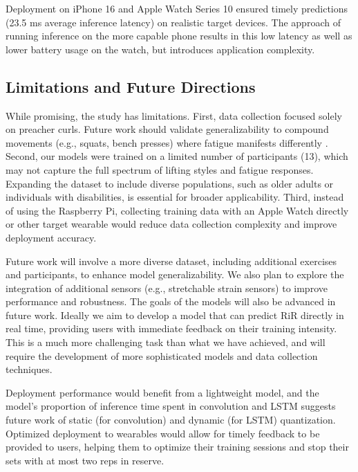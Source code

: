 \documentclass[conference]{IEEEtran}
\begin{document}
Deployment on iPhone 16 and Apple Watch Series 10 ensured timely predictions (23.5 ms average inference latency) on realistic target devices. The approach of running inference on the more capable phone results in this low latency as well as lower battery usage on the watch, but introduces application complexity.

\subsection{Limitations and Future Directions}
While promising, the study has limitations. First, data collection focused solely on preacher curls. Future work should validate generalizability to compound movements (e.g., squats, bench presses) where fatigue manifests differently \cite{velloso2013qualitative}. Second, our models were trained on a limited number of participants (13), which may not capture the full spectrum of lifting styles and fatigue responses. Expanding the dataset to include diverse populations, such as older adults or individuals with disabilities, is essential for broader applicability. Third, instead of using the Raspberry Pi, collecting training data with an Apple Watch directly or other target wearable would reduce data collection complexity and improve deployment accuracy.

Future work will involve a more diverse dataset, including additional exercises and participants, to enhance model generalizability. We also plan to explore the integration of additional sensors (e.g., stretchable strain sensors) to improve performance and robustness. The goals of the models will also be advanced in future work. Ideally we aim to develop a model that can predict RiR directly in real time, providing users with immediate feedback on their training intensity. This is a much more challenging task than what we have achieved, and will require the development of more sophisticated models and data collection techniques.

Deployment performance would benefit from a lightweight model, and the model's proportion of inference time spent in convolution and LSTM suggests future work of static (for convolution) and dynamic (for LSTM) quantization. Optimized deployment to wearables would allow for timely feedback to be provided to users, helping them to optimize their training sessions and stop their sets with at most two reps in reserve.
\end{document}

